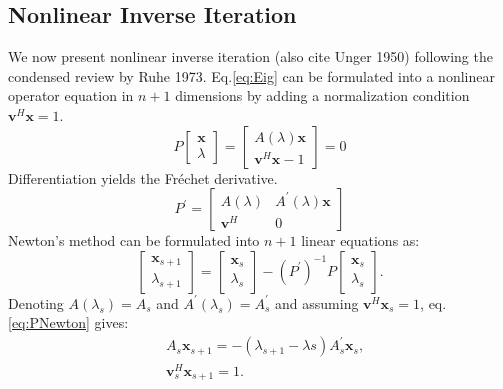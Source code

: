\documentclass[11pt,letterpaper]{article}
\begin{document}
\subsection{Nonlinear Inverse Iteration}
We now present nonlinear inverse iteration \citep{anselone_solution_1968} (also cite Unger 1950) following the condensed review by Ruhe 1973. Eq.\ref{eq:Eig} can be formulated into a nonlinear operator equation in $n+1$ dimensions by adding a normalization condition $\mathbf{v}^{H}\mathbf{x}=1$. 
\begin{equation}\label{eq:P}
P \begin{bmatrix} \mathbf{x} \\ \lambda \end{bmatrix} =
\begin{bmatrix} A(\lambda)\mathbf{x} \\ \mathbf{v}^{H}\mathbf{x}-1 \end{bmatrix} = 0
\end{equation}
Differentiation yields the Fr\'{e}chet derivative. 
\begin{equation}\label{eq:Pprime}
P^{\prime}=\begin{bmatrix} A(\lambda) & A^{\prime}(\lambda)\mathbf{x}  \\ \mathbf{v}^{H} & 0 \end{bmatrix}
\end{equation}
Newton's method can be formulated into $n+1$ linear equations as:
\begin{equation}\label{eq:PNewton}
\begin{bmatrix} \mathbf{x}_{s+1} \\ \lambda_{s+1} \end{bmatrix} = \begin{bmatrix} \mathbf{x}_{s} \\ \lambda_{s} \end{bmatrix} - (P^{\prime})^{-1} P \begin{bmatrix} \mathbf{x}_{s} \\ \lambda_{s} \end{bmatrix}.
\end{equation}
Denoting $A(\lambda_{s})=A_{s}$ and $A^{\prime}(\lambda_{s})=A^{\prime}_{s}$ and assuming $\mathbf{v}^{H}\mathbf{x}_{s}=1$, eq.\ref{eq:PNewton} gives: 
\begin{align*}
& A_s\mathbf{x}_{s+1}=-(\lambda_{s+1}-\lambda{s}) A^{\prime}_{s}\mathbf{x}_{s},
\\
& \mathbf{v}_{s}^{H}\mathbf{x}_{s+1}=1.
\end{align*}
\end{document}
